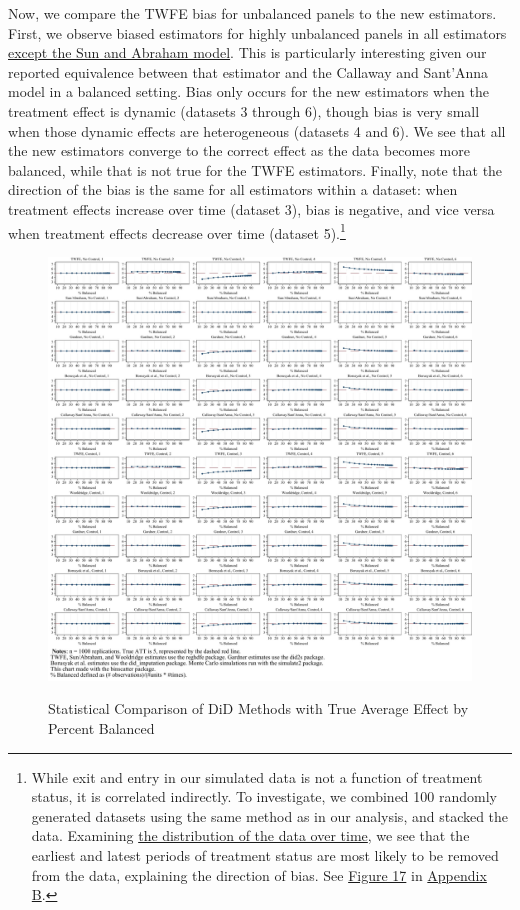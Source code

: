 \documentclass[12pt]{article}
\begin{document}
Now, we compare the TWFE bias for unbalanced panels to the new estimators. First, we observe biased estimators for highly unbalanced panels in all estimators \uline{except the Sun and Abraham model}. This is particularly interesting given our reported equivalence between that estimator and the Callaway and Sant’Anna model in a balanced setting. Bias only occurs for the new estimators when the treatment effect is dynamic (datasets 3 through 6), though bias is very small when those dynamic effects are heterogeneous (datasets 4 and 6). We see that all the new estimators converge to the correct effect as the data becomes more balanced, while that is not true for the TWFE estimators. Finally, note that the direction of the bias is the same for all estimators within a dataset: when treatment effects increase over time (dataset 3), bias is negative, and vice versa when treatment effects decrease over time (dataset 5).\footnote{While exit and entry in our simulated data is not a function of treatment status, it is correlated indirectly. To investigate, we combined 100 randomly generated datasets using the same method as in our analysis, and stacked the data. Examining \hyperref[fig:dist-treat]{the distribution of the data over time}, we see that the earliest and latest periods of treatment status are most likely to be removed from the data, explaining the direction of bias. See \hyperref[fig:dist-treat]{Figure 17} in \hyperref[sec:appendixb]{Appendix B}.}
\begin{figure}[H]
    \centering
    \caption{Statistical Comparison of DiD Methods with True Average Effect by Percent Balanced}
    \includegraphics[width=6in]{Figures/Binscatters by Percent Balanced Common Scale.jpg}
    \label{fig:estimators-balanced}
\end{figure}
\end{document}

